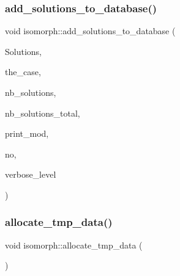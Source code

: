 \subsubsection{\texorpdfstring{add\+\_\+solutions\+\_\+to\+\_\+database()}{add\_solutions\_to\_database()}}
{\footnotesize\ttfamily void isomorph\+::add\+\_\+solutions\+\_\+to\+\_\+database (\begin{DoxyParamCaption}\item[{\mbox{\hyperlink{galois_8h_a09fddde158a3a20bd2dcadb609de11dc}{I\+NT}} $\ast$}]{Solutions,  }\item[{\mbox{\hyperlink{galois_8h_a09fddde158a3a20bd2dcadb609de11dc}{I\+NT}}}]{the\+\_\+case,  }\item[{\mbox{\hyperlink{galois_8h_a09fddde158a3a20bd2dcadb609de11dc}{I\+NT}}}]{nb\+\_\+solutions,  }\item[{\mbox{\hyperlink{galois_8h_a09fddde158a3a20bd2dcadb609de11dc}{I\+NT}}}]{nb\+\_\+solutions\+\_\+total,  }\item[{\mbox{\hyperlink{galois_8h_a09fddde158a3a20bd2dcadb609de11dc}{I\+NT}}}]{print\+\_\+mod,  }\item[{\mbox{\hyperlink{galois_8h_a09fddde158a3a20bd2dcadb609de11dc}{I\+NT}} \&}]{no,  }\item[{\mbox{\hyperlink{galois_8h_a09fddde158a3a20bd2dcadb609de11dc}{I\+NT}}}]{verbose\+\_\+level }\end{DoxyParamCaption})}

\mbox{\label{classisomorph_a2aba74f4e4c524cfee6c9faea33474c2}} 
\subsubsection{\texorpdfstring{allocate\+\_\+tmp\+\_\+data()}{allocate\_tmp\_data()}}
{\footnotesize\ttfamily void isomorph\+::allocate\+\_\+tmp\+\_\+data (\begin{DoxyParamCaption}{ }\end{DoxyParamCaption})}

\mbox{\label{classisomorph_aab57f0f3ffbae79f2cb3b055fcd9c090}} 
